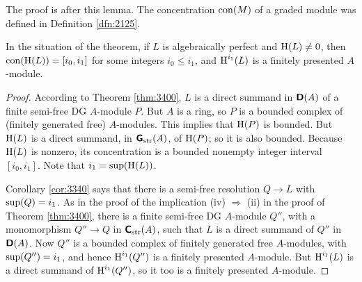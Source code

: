 The proof is after this lemma. The concentration $\operatorname{con}(M)$ of a graded 
module was defined in Definition \ref{dfn:2125}. 

\begin{lem} \label{lem:3415}
In the situation of the theorem, if $L$ is algebraically perfect
and $\operatorname{H}(L) \neq 0$, then 
$\operatorname{con}(\operatorname{H}(L)) = [i_0, i_1]$ for some integers $i_0 \leq i_1$, and 
$\operatorname{H}^{i_1}(L)$ is a finitely presented $A$-module. 
\end{lem}

\begin{proof}
According to Theorem \ref{thm:3400}, $L$ is a direct summand in $\boldsymbol{\mathsf{D}}(A)$ 
of a finite semi-free DG $A$-module $P$. But $A$ is a ring, so $P$ is a bounded 
complex of (finitely generated free) $A$-modules. This implies that 
$\operatorname{H}(P)$ is bounded. But $\operatorname{H}(L)$ is a direct summand, in 
$\boldsymbol{\mathsf{G}}_{\mathrm{str}}(A)$, of $\operatorname{H}(P)$; so it is also bounded. 
Because $\operatorname{H}(L)$ is nonzero, its concentration is a bounded nonempty integer
interval $[i_0, i_1]$. Note that 
$i_1 = \operatorname{sup}(\operatorname{H}(L))$. 

Corollary \ref{cor:3340}
says that there is a semi-free resolution $Q \to L$ with 
$\operatorname{sup}(Q) = i_1$. As in the proof of the implication 
(iv) $\Rightarrow$ (ii) in the proof of Theorem \ref{thm:3400}, 
there is a finite semi-free DG $A$-module $Q''$, with a monomorphism 
$Q'' \to Q$ in $\boldsymbol{\mathsf{C}}_{\mathrm{str}}(A)$, 
such that $L$ is a direct summand of $Q''$ in $\boldsymbol{\mathsf{D}}(A)$. 
Now $Q''$ is a bounded complex of finitely generated free $A$-modules, with 
$\operatorname{sup}(Q'') = i_1$, and hence $\operatorname{H}^{i_1}(Q'')$ is a finitely 
presented $A$-module. But $\operatorname{H}^{i_1}(L)$ is a direct summand of 
$\operatorname{H}^{i_1}(Q'')$, so it too is a finitely presented $A$-module.
\end{proof}

